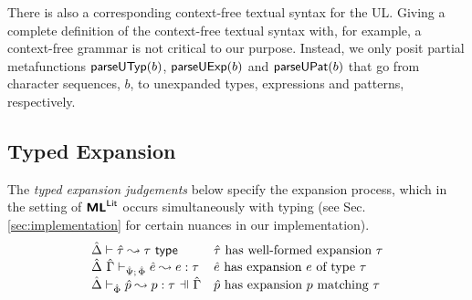 \documentclass[acmsmall,screen]{acmart}
\begin{document}
There is also a corresponding context-free textual syntax for the UL. 
Giving a complete definition of the context-free textual syntax with, for example, a context-free grammar is not critical to our purpose. 
Instead, we only posit partial metafunctions $\mathsf{parseUTyp}(b)$, $\mathsf{parseUExp}(b)$ and $\mathsf{parseUPat}(b)$  that go from character sequences, $b$, to unexpanded types, expressions and patterns, respectively.



\vspace{-5px}
\subsection{Typed Expansion}\label{sec:typed-expansion-U}\label{sec:s-TE}
The \emph{typed expansion judgements} below specify the expansion process, which in the setting of $\textsf{\textbf{ML}}^\textsf{Lit}$ occurs simultaneously with typing (see Sec. \ref{sec:implementation} for certain nuances in our implementation).
\[\begin{array}{ll}
\expandsTU{\uDelta}{\utau}{\tau} & \text{$\utau$ has well-formed expansion $\tau$}\\
\expandsUPX{\ue}{e}{\tau} & \text{$\ue$ has expansion $e$ of type $\tau$}\\
\patExpands{\upctx}{\uPhi}{\upv}{p}{\tau} & \text{$\upv$ has expansion $p$ matching $\tau$}
\end{array}\]
\end{document}
